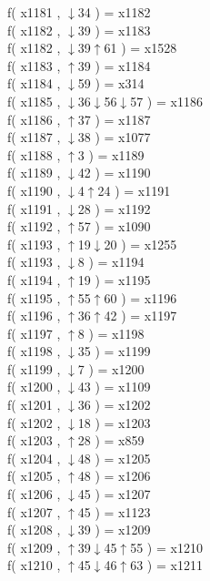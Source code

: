 f( x1181 , $\downarrow$34 ) = x1182 \\
f( x1182 , $\downarrow$39 ) = x1183 \\
f( x1182 , $\downarrow$39$\uparrow$61 ) = x1528 \\
f( x1183 , $\uparrow$39 ) = x1184 \\
f( x1184 , $\downarrow$59 ) = x314 \\
f( x1185 , $\downarrow$36$\downarrow$56$\downarrow$57 ) = x1186 \\
f( x1186 , $\uparrow$37 ) = x1187 \\
f( x1187 , $\downarrow$38 ) = x1077 \\
f( x1188 , $\uparrow$3 ) = x1189 \\
f( x1189 , $\downarrow$42 ) = x1190 \\
f( x1190 , $\downarrow$4$\uparrow$24 ) = x1191 \\
f( x1191 , $\downarrow$28 ) = x1192 \\
f( x1192 , $\uparrow$57 ) = x1090 \\
f( x1193 , $\uparrow$19$\downarrow$20 ) = x1255 \\
f( x1193 , $\downarrow$8 ) = x1194 \\
f( x1194 , $\uparrow$19 ) = x1195 \\
f( x1195 , $\uparrow$55$\uparrow$60 ) = x1196 \\
f( x1196 , $\uparrow$36$\uparrow$42 ) = x1197 \\
f( x1197 , $\uparrow$8 ) = x1198 \\
f( x1198 , $\downarrow$35 ) = x1199 \\
f( x1199 , $\downarrow$7 ) = x1200 \\
f( x1200 , $\downarrow$43 ) = x1109 \\
f( x1201 , $\downarrow$36 ) = x1202 \\
f( x1202 , $\downarrow$18 ) = x1203 \\
f( x1203 , $\uparrow$28 ) = x859 \\
f( x1204 , $\downarrow$48 ) = x1205 \\
f( x1205 , $\uparrow$48 ) = x1206 \\
f( x1206 , $\downarrow$45 ) = x1207 \\
f( x1207 , $\uparrow$45 ) = x1123 \\
f( x1208 , $\downarrow$39 ) = x1209 \\
f( x1209 , $\uparrow$39$\downarrow$45$\uparrow$55 ) = x1210 \\
f( x1210 , $\uparrow$45$\downarrow$46$\uparrow$63 ) = x1211 \\

